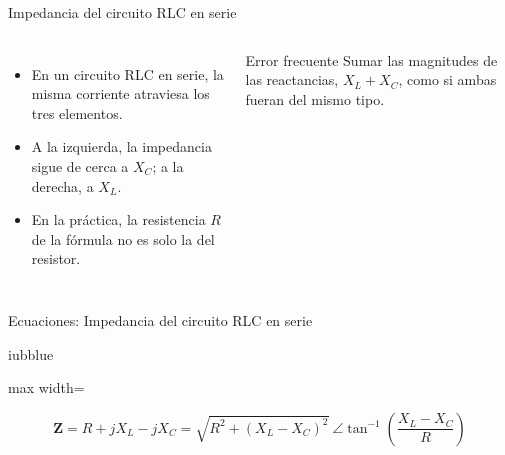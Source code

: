 \documentclass[aspectratio=169,11pt,xcolor={table}]{beamer}
\begin{document}
\begin{frame}{Impedancia del circuito RLC en serie}
\begin{columns}[c,onlytextwidth]
\small
\begin{itemize}\setlength{\itemsep}{4pt}
  \item En un circuito RLC en serie, la misma corriente atraviesa los tres elementos.
  \item A la izquierda, la impedancia sigue de cerca a $X_C$; a la derecha, a $X_L$.
  \item En la práctica, la resistencia $R$ de la fórmula no es solo la del resistor.
\end{itemize}
\begin{cardO}{Error frecuente}
\footnotesize Sumar las magnitudes de las reactancias, $X_L + X_C$, como si ambas fueran del mismo tipo.
\end{cardO}
\end{columns}
\end{frame}

\begin{frame}{Ecuaciones: Impedancia del circuito RLC en serie}
\begin{cajaplana}{iubblue}
\centering
\begin{adjustbox}{max width=\linewidth}
\begin{minipage}{1.20\linewidth}
{\large
\begin{equation*}
  \mathbf{Z} = R + jX_L - jX_C = \sqrt{R^{2} + (X_L - X_C)^{2}}\ \angle \tan^{-1}\!\left(\frac{X_L - X_C}{R}\right)
\end{equation*}
}
\end{minipage}
\end{adjustbox}
\end{cajaplana}
\end{frame}
\end{document}
